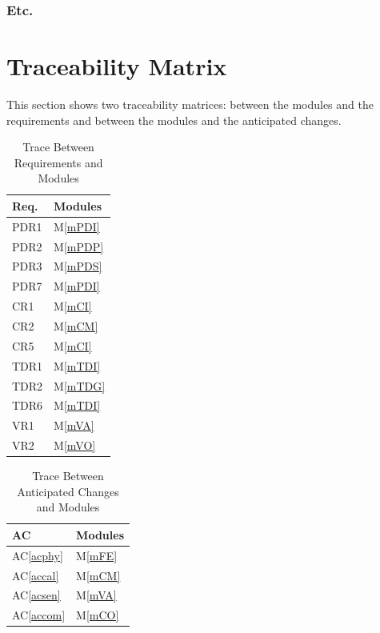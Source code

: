 \documentclass[12pt, titlepage]{article}
\newcommand{\acref}[1]{AC\ref{#1}}
\newcommand{\mref}[1]{M\ref{#1}}
\begin{document}
\subsubsection{Etc.}

\section{Traceability Matrix} \label{SecTM}

This section shows two traceability matrices: between the modules and the
requirements and between the modules and the anticipated changes.

\begin{table}[H]
\centering
\begin{tabular}{p{} p{}}
\toprule
\textbf{Req.} & \textbf{Modules}\\
\midrule
PDR1 & \mref{mPDI} \\
PDR2 & \mref{mPDP} \\
PDR3 & \mref{mPDS} \\
PDR7 & \mref{mPDI} \\
CR1 &  \mref{mCI}  \\
CR2 &  \mref{mCM}  \\
CR5 &  \mref{mCI}  \\
TDR1 & \mref{mTDI} \\
TDR2 & \mref{mTDG} \\
TDR6 & \mref{mTDI} \\
VR1 &  \mref{mVA}  \\
VR2 &  \mref{mVO}  \\
\bottomrule
\end{tabular}
\caption{Trace Between Requirements and Modules}
\label{TblRT}
\end{table}

\begin{table}[H]
\centering
\begin{tabular}{p{} p{}}
\toprule
\textbf{AC} & \textbf{Modules}\\
\midrule
\acref{acphy} & \mref{mFE}\\
\acref{accal} & \mref{mCM}\\
\acref{acsen} & \mref{mVA}\\
\acref{accom} & \mref{mCO}\\


\bottomrule
\end{tabular}
\caption{Trace Between Anticipated Changes and Modules}
\label{TblACT}
\end{table}
\end{document}
